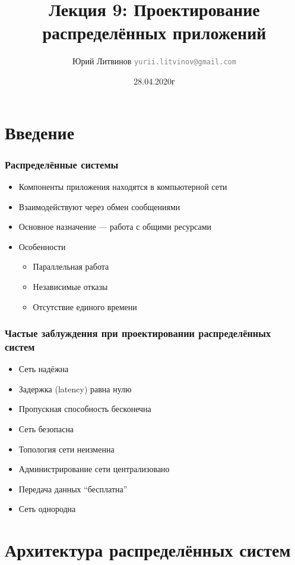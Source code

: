 \documentclass[xetex,mathserif,serif]{beamer}
\title{Лекция 9: Проектирование распределённых приложений}
\author[Юрий Литвинов]{Юрий Литвинов \newline \textcolor{gray}{\small\texttt{yurii.litvinov@gmail.com}}}
\date{28.04.2020г}
\begin{document}
	
	\frame{\titlepage}

	\section{Введение}

	\begin{frame}
		\frametitle{Распределённые системы}
		\begin{itemize}
			\item Компоненты приложения находятся в компьютерной сети
			\item Взаимодействуют через обмен сообщениями
			\item Основное назначение --- работа с общими ресурсами
			\item Особенности
			\begin{itemize}
				\item Параллельная работа
				\item Независимые отказы
				\item Отсутствие единого времени
			\end{itemize}
		\end{itemize}
	\end{frame}

	\begin{frame}
		\frametitle{Частые заблуждения при проектировании распределённых систем}
		\begin{itemize}
			\item Сеть надёжна
			\item Задержка (latency) равна нулю
			\item Пропускная способность бесконечна
			\item Сеть безопасна
			\item Топология сети неизменна
			\item Администрирование сети централизовано
			\item Передача данных ``бесплатна''
			\item Сеть однородна
		\end{itemize}
	\end{frame}

	\section{Архитектура распределённых систем}
\end{document}

